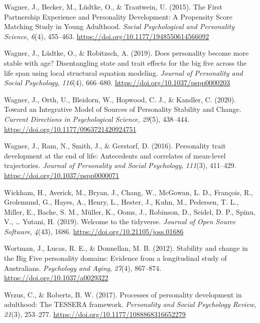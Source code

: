 \documentclass[
  english,
  man, noextraspace]{apa7}
\begin{document}
\leavevmode\hypertarget{ref-wagnerFirstPartnershipExperience2015}{}%
Wagner, J., Becker, M., Lüdtke, O., \& Trautwein, U. (2015). The First Partnership Experience and Personality Development: A Propensity Score Matching Study in Young Adulthood. \emph{Social Psychological and Personality Science}, \emph{6}(4), 455--463. \url{https://doi.org/10.1177/1948550614566092}

\leavevmode\hypertarget{ref-wagnerDoesPersonalityBecome2019}{}%
Wagner, J., Lüdtke, O., \& Robitzsch, A. (2019). Does personality become more stable with age? Disentangling state and trait effects for the big five across the life span using local structural equation modeling. \emph{Journal of Personality and Social Psychology}, \emph{116}(4), 666--680. \url{https://doi.org/10.1037/pspp0000203}

\leavevmode\hypertarget{ref-wagnerIntegrativeModelSources2020}{}%
Wagner, J., Orth, U., Bleidorn, W., Hopwood, C. J., \& Kandler, C. (2020). Toward an Integrative Model of Sources of Personality Stability and Change. \emph{Current Directions in Psychological Science}, \emph{29}(5), 438--444. \url{https://doi.org/10.1177/0963721420924751}

\leavevmode\hypertarget{ref-wagnerPersonalityTraitDevelopment2016}{}%
Wagner, J., Ram, N., Smith, J., \& Gerstorf, D. (2016). Personality trait development at the end of life: Antecedents and correlates of mean-level trajectories. \emph{Journal of Personality and Social Psychology}, \emph{111}(3), 411--429. \url{https://doi.org/10.1037/pspp0000071}

\leavevmode\hypertarget{ref-tidyverse2019}{}%
Wickham, H., Averick, M., Bryan, J., Chang, W., McGowan, L. D., François, R., Grolemund, G., Hayes, A., Henry, L., Hester, J., Kuhn, M., Pedersen, T. L., Miller, E., Bache, S. M., Müller, K., Ooms, J., Robinson, D., Seidel, D. P., Spinu, V., \ldots{} Yutani, H. (2019). Welcome to the tidyverse. \emph{Journal of Open Source Software}, \emph{4}(43), 1686. \url{https://doi.org/10.21105/joss.01686}

\leavevmode\hypertarget{ref-wortmanStabilityChangeBig2012}{}%
Wortman, J., Lucas, R. E., \& Donnellan, M. B. (2012). Stability and change in the Big Five personality domains: Evidence from a longitudinal study of Australians. \emph{Psychology and Aging}, \emph{27}(4), 867--874. \url{https://doi.org/10.1037/a0029322}

\leavevmode\hypertarget{ref-wrzusProcessesPersonalityDevelopment2017}{}%
Wrzus, C., \& Roberts, B. W. (2017). Processes of personality development in adulthood: The TESSERA framework. \emph{Personality and Social Psychology Review}, \emph{21}(3), 253--277. \url{https://doi.org/10.1177/1088868316652279}
\end{document}
